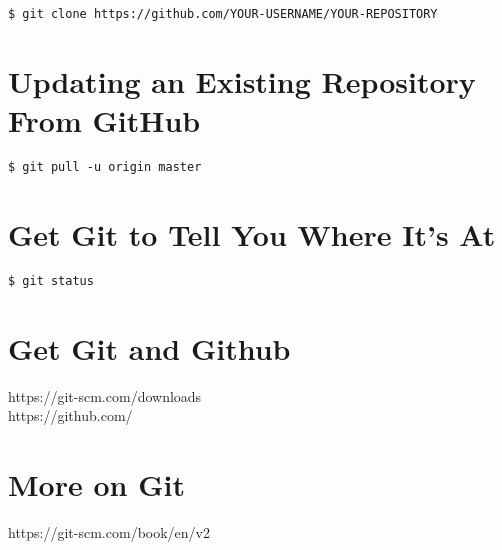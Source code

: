 \documentclass{tufte-handout}
\begin{document}
\begin{shaded}
\begin{verbatim}
$ git clone https://github.com/YOUR-USERNAME/YOUR-REPOSITORY
\end{verbatim}
\end{shaded}

\section{Updating an Existing Repository From GitHub }

\begin{shaded}
\begin{verbatim}
$ git pull -u origin master
\end{verbatim}
\end{shaded}


\section{Get Git to Tell You Where It's At}

\begin{shaded}
\begin{verbatim}
$ git status
\end{verbatim}
\end{shaded}




\section{Get Git and Github}

https://git-scm.com/downloads  \\
\noindent https://github.com/ 

\section{More on Git}
https://git-scm.com/book/en/v2



\end{document}
